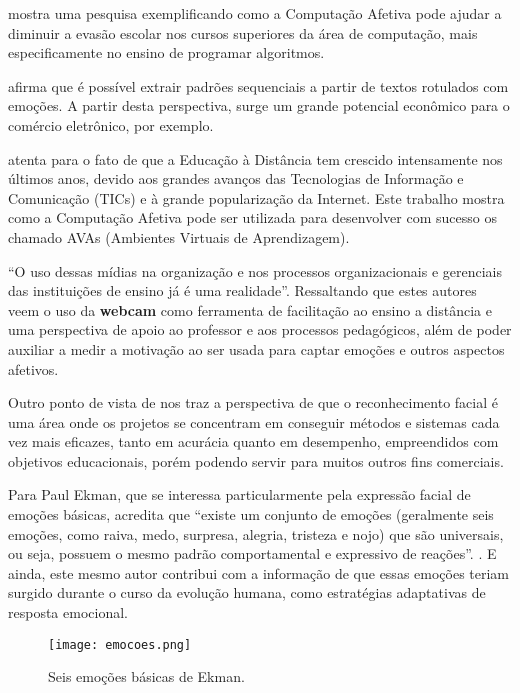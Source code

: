 \documentclass[
	12pt,				    %
	openright,			    %
	oneside,			    %
	a4paper,			    %
    sumario=tradicional,    %
	english,			    %
	brazil,				    %
	]{abntex2}              %
\begin{document}
 mostra uma pesquisa exemplificando como a Computação Afetiva pode ajudar a diminuir a evasão escolar nos cursos superiores da área de computação, mais especificamente no ensino de programar algoritmos.

 afirma que é possível extrair padrões sequenciais a partir de textos rotulados com emoções. A partir desta perspectiva, surge um grande potencial econômico para o comércio eletrônico, por exemplo.

 atenta para o fato de que a Educação à Distância tem crescido intensamente nos últimos anos, devido aos grandes avanços das Tecnologias de Informação e Comunicação (TICs) e à grande popularização da Internet. Este trabalho mostra como a Computação Afetiva pode ser utilizada para desenvolver com sucesso os chamado AVAs (Ambientes Virtuais de Aprendizagem).

``O uso dessas mídias na organização e nos processos organizacionais e gerenciais das instituições de ensino já é uma realidade''\cite{amorim2009}. Ressaltando que estes autores veem o uso da \textbf{webcam} como ferramenta de facilitação ao ensino a distância e uma perspectiva de apoio ao professor e aos processos pedagógicos, além de poder auxiliar a medir a motivação ao ser usada para captar emoções e outros aspectos afetivos.

Outro ponto de vista de  nos traz a perspectiva de que o reconhecimento facial é uma área onde os projetos se concentram em conseguir métodos e sistemas cada vez mais eficazes, tanto em acurácia quanto em desempenho, empreendidos com objetivos educacionais, porém podendo servir para muitos outros fins comerciais. 

Para  Paul Ekman, que se interessa particularmente pela expressão facial de emoções básicas, acredita que ``existe um conjunto de emoções (geralmente seis emoções, como raiva, medo, surpresa, alegria, tristeza e nojo) que são universais, ou seja, possuem o mesmo padrão comportamental e expressivo de reações''. . E ainda, este mesmo autor contribui com a informação de que essas emoções teriam surgido durante o curso da evolução humana, como estratégias adaptativas de resposta emocional.

\begin{figure}[htbp]
    \label{fig: Seis emoções básicas de Ekman} 
    \centering
    \texttt{[image: emocoes.png]} 
    \caption{Seis emoções básicas de Ekman.}
\end{figure}
\end{document}
